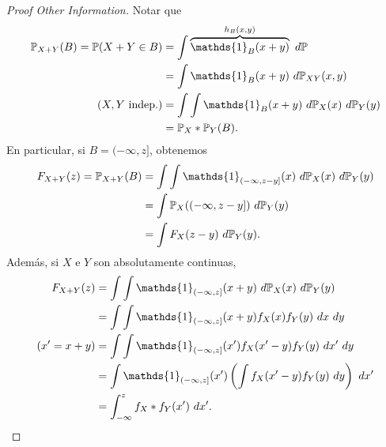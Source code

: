 \begin{proof}[Proof Other Information]
	Notar que
	\begin{align*}
		\mbb{P}_{X + Y}(B) = \mbb{P}(X + Y \in B) &= \int \overbrace{\mathds{1}_{B}(x + y)}^{h_{B}(x,y)} \ d \mbb{P} \\
		&= \int \mathds{1}_{B}(x + y) \ d \mbb{P}_{XY}(x,y) \\
		(X,Y \text{ indep.}) &= \int \int \mathds{1}_{B}(x + y) \ d\mbb{P}_{X}(x) \ d\mbb{P}_{Y}(y) \\
		&= \mbb{P}_{X} * \mbb{P}_{Y} (B)
	.\end{align*}
	En particular, si $B = (-\infty,z]$, obtenemos
	\begin{align*}
		F_{X + Y}(z) = \mbb{P}_{X + Y}(B) &= \int\int \mathds{1}_{(-\infty, z-y]}(x) \ d\mbb{P}_{X}(x) \ d\mbb{P}_{Y}(y) \\
		&= \int \mbb{P}_{X}((-\infty,z-y]) \ d\mbb{P}_{Y}(y) \\
		&= \int F_{X}(z - y) \ d\mbb{P}_{Y}(y)
	.\end{align*}
	Además, si $X$ e $Y$ son absolutamente continuas,
	\begin{align*}
		F_{X + Y}(z) &= \int \int \mathds{1}_{(-\infty,z]}(x + y) \ d\mbb{P}_{X}(x) \ d\mbb{P}_{Y}(y) \\
		&= \int \int \mathds{1}_{(-\infty,z]}(x + y) f_{X}(x) f_{Y}(y) \ dx \ dy \\
		(x' = x + y) &= \int \int \mathds{1}_{(-\infty,z]}(x') f_{X}(x' - y) f_{Y}(y) \ dx' \ dy \\
		&= \int \mathds{1}_{(-\infty,z]}(x') \left( \int f_{X}(x' - y) f_{Y}(y) \ dy \right) \ dx' \\
		&= \int_{-\infty}^{z} f_{X} * f_{Y}(x') \ dx'
	.\qedhere\end{align*}
\end{proof}
